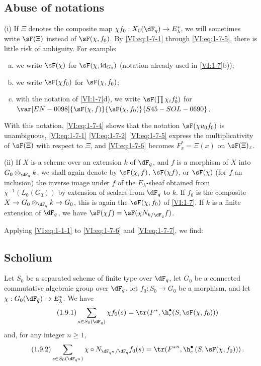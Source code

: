 \subsection{Abuse of notations}\label{VI:1-8}

(i) If $\Xi$ denotes the composite map 
$\chi f_0:X_0(\dF_q) \to E_\lambda^\ast$, we will sometimes write $\sF(\Xi)$ 
instead of $\sF(\chi,f_0)$. By \eqref{VI:eq:1-7-1} through \eqref{VI:eq:1-7-5}, 
there is little risk of ambiguity. For example:
\begin{enumerate}[a)]
  \item we write $\sF(\chi)$ for $\sF(\chi,\operatorname{id}_{G_0})$ 
    (notation already used in \ref{VI:1-7}b)); 
  \item we write $\sF(\chi f_0)$ for $\sF(\chi,f_0)$;
  \item with the notation of \ref{VI:1-7}d), we write 
    $\sF(\prod \chi_i f_0^i)$ for $\var[EN-0098]{\sF(\chi,f)}{\sF(\chi,f_0)}{S45-SOL-0690}$. 
\end{enumerate}

With this notation, \eqref{VI:eq:1-7-4} shows that the notation 
$\sF(\chi u_0 f_0)$ is unambiguous, \eqref{VI:eq:1-7-1} \eqref{VI:eq:1-7-2} 
\eqref{VI:eq:1-7-5} express the multiplicativity of $\sF(\Xi)$ with respect to $\Xi$, 
and \eqref{VI:eq:1-7-6} becomes $F_x^\ast = \Xi(x)$ on $\sF(\Xi)_x$.

(ii) If $X$ is a scheme over an extension $k$ of $\dF_q$, and $f$ is a 
morphism of $X$ into $G_0\otimes_{\dF_q} k$, we shall again denote by $\sF(\chi,f)$, 
$\sF(\chi f)$, or $\sF(\chi)$ (for $f$ an inclusion) the inverse image under 
$f$ of the $E_\lambda$-sheaf obtained from $\chi^{-1}(L_0(G_0))$ by extension of 
scalars from $\dF_q$ to $k$. If $f_0$ is the composite 
$X\to G_0\otimes_{\dF_q} k \to G_0$, this is again the $\sF(\chi,f_0)$ of 
\ref{VI:1-7}. If $k$ is a finite extension of $\dF_q$, we have 
$\sF(\chi f) = \sF(\chi N_{k/\dF_q} f)$. 

Applying \eqref{VI:eq:1-1-1} to \eqref{VI:eq:1-7-6} and \eqref{VI:eq:1-7-7}, 
we find: 





\subsection{Scholium}\label{VI:1-9}
Let $S_0$ be a separated scheme of finite type over $\dF_q$, let $G_0$ be a 
connected commutative algebraic group over $\dF_q$, let $f_0:S_0\to G_0$ be a morphism, and let 
$\chi:G_0(\dF_q) \to E_\lambda^\ast$. We have 
\begin{equation*}\tag{1.9.1}\label{VI:eq:1-9-1}
  \sum_{s\in S_0(\dF_q)} \chi f_0(s) = \tr(F^\ast,\h_c^\bullet(S,\sF(\chi,f_0))) 
\end{equation*}
and, for any integer $n\geqslant 1$,
\begin{equation*}\tag{1.9.2}\label{VI:eq:1-9-2}
  \sum_{s\in S_0(\dF_{q^n})} \chi\circ N_{\dF_{q^n}/\dF_q} f_0(s) = \tr({F^\ast}^n, \h_c^\bullet\left(S,\sF(\chi,f_0))\right) \text{.}
\end{equation*}







